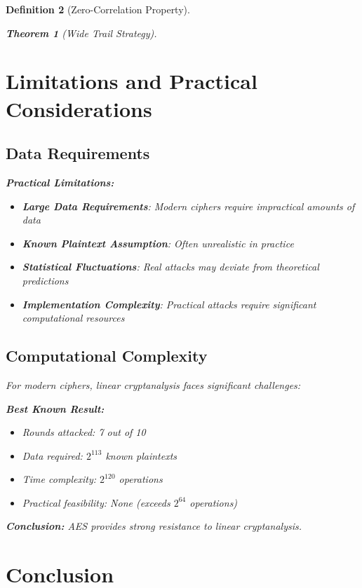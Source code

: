 \documentclass[12pt,a4paper]{article}
\newtheorem{theorem}{Theorem}[section]
\newtheorem{definition}[theorem]{Definition}
\begin{document}
\begin{definition}[Zero-Correlation Property]
\begin{theorem}[Wide Trail Strategy]
\section{Limitations and Practical Considerations}

\subsection{Data Requirements}

\begin{statisticsbox}
\textbf{Practical Limitations:}
\begin{itemize}
    \item \textbf{Large Data Requirements}: Modern ciphers require impractical amounts of data
    \item \textbf{Known Plaintext Assumption}: Often unrealistic in practice
    \item \textbf{Statistical Fluctuations}: Real attacks may deviate from theoretical predictions
    \item \textbf{Implementation Complexity}: Practical attacks require significant computational resources
\end{itemize}
\end{statisticsbox}

\subsection{Computational Complexity}

For modern ciphers, linear cryptanalysis faces significant challenges:

\begin{examplebox}[title=AES-128 Linear Attack Infeasibility]
\textbf{Best Known Result:}
\begin{itemize}
    \item Rounds attacked: 7 out of 10
    \item Data required: $2^{113}$ known plaintexts
    \item Time complexity: $2^{120}$ operations
    \item Practical feasibility: None (exceeds $2^{64}$ operations)
\end{itemize}

\textbf{Conclusion:} AES provides strong resistance to linear cryptanalysis.
\end{examplebox}

\section{Conclusion}


\end{theorem}
\end{definition}
\end{document}
